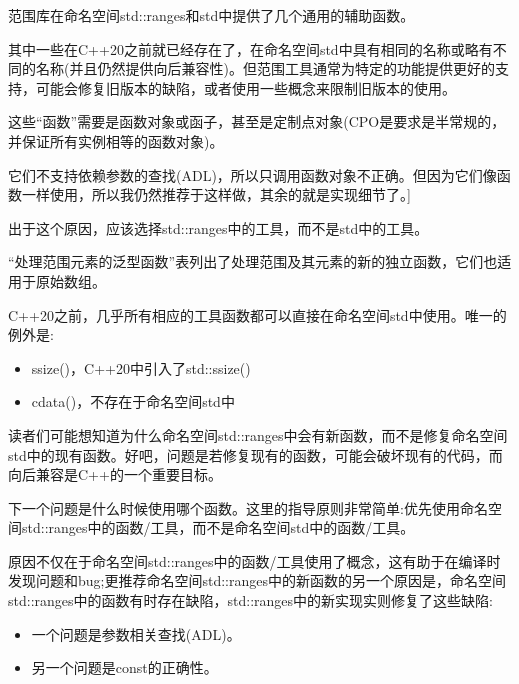 
范围库在命名空间std::ranges和std中提供了几个通用的辅助函数。

其中一些在C++20之前就已经存在了，在命名空间std中具有相同的名称或略有不同的名称(并且仍然提供向后兼容性)。但范围工具通常为特定的功能提供更好的支持，可能会修复旧版本的缺陷，或者使用一些概念来限制旧版本的使用。

这些“函数”需要是函数对象或函子，甚至是定制点对象(CPO是要求是半常规的，并保证所有实例相等的函数对象)。

它们不支持依赖参数的查找(ADL)，所以只调用函数对象不正确。但因为它们像函数一样使用，所以我仍然推荐于这样做，其余的就是实现细节了。]

出于这个原因，应该选择std::ranges中的工具，而不是std中的工具。


“处理范围元素的泛型函数”表列出了处理范围及其元素的新的独立函数，它们也适用于原始数组。

C++20之前，几乎所有相应的工具函数都可以直接在命名空间std中使用。唯一的例外是:

\begin{itemize}
\item
ssize()，C++20中引入了std::ssize()

\item
cdata()，不存在于命名空间std中
\end{itemize}

读者们可能想知道为什么命名空间std::ranges中会有新函数，而不是修复命名空间std中的现有函数。好吧，问题是若修复现有的函数，可能会破坏现有的代码，而向后兼容是C++的一个重要目标。

下一个问题是什么时候使用哪个函数。这里的指导原则非常简单:优先使用命名空间std::ranges中的函数/工具，而不是命名空间std中的函数/工具。

原因不仅在于命名空间std::ranges中的函数/工具使用了概念，这有助于在编译时发现问题和bug;更推荐命名空间std::ranges中的新函数的另一个原因是，命名空间std::ranges中的函数有时存在缺陷，std::ranges中的新实现实则修复了这些缺陷:

\begin{itemize}
\item
一个问题是参数相关查找(ADL)。

\item
另一个问题是const的正确性。
\end{itemize}

